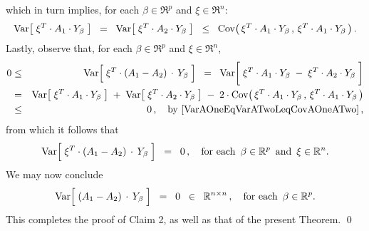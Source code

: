 which in turn implies, for each $\beta \in \Re^{p}$ and $\xi \in \Re^{n}$:
\begin{equation}\label{VarAOneEqVarATwoLeqCovAOneATwo}
\textnormal{Var}\!\left[\; \xi^{T} \cdot A_{1} \cdot Y_{\beta} \;\right]
\;\; = \;\;
\textnormal{Var}\!\left[\; \xi^{T} \cdot A_{2} \cdot Y_{\beta} \;\right]
\;\; \leq \;\;
\textnormal{Cov}\!\left(\,\xi^{T} \cdot A_{1} \cdot Y_{\beta}\,,\,\xi^{T} \cdot A_{1} \cdot Y_{\beta}\,\right).
\end{equation}
Lastly, observe that, for each $\beta \in \Re^{p}$ and $\xi \in \Re^{n}$,
\begin{eqnarray*}
0
&\leq&
	\Var\!\left[\;\xi^{T} \cdot (A_{1} - A_{2}) \overset{{\color{white}-}}{\cdot} Y_{\beta}\;\right]
\;\; = \;\;
	\Var\!\left[\;\xi^{T} \cdot A_{1} \cdot Y_{\beta} \;\overset{{\color{white}\vert}}{-}\; \xi^{T} \cdot A_{2} \cdot Y_{\beta}\;\right]
\\
& = &
	\Var\!\left[\;\xi^{T} \cdot A_{1} \cdot Y_{\beta}\;\right]
	\; + \;
	\Var\!\left[\;\xi^{T} \cdot A_{2} \cdot Y_{\beta}\;\right]
	\; - \;
	2\cdot\Cov\!\left(\,\xi^{T} \cdot A_{1} \cdot Y_{\beta}\,,\,\xi^{T} \cdot A_{1} \cdot Y_{\beta}\,\right)
\\
&\leq&
	0\,,
	\quad\textnormal{by \eqref{VarAOneEqVarATwoLeqCovAOneATwo}}\,,
\end{eqnarray*}
from which it follows that
\begin{equation*}
\Var\!\left[\;\xi^{T} \cdot (A_{1} - A_{2}) \overset{{\color{white}-}}{\cdot} Y_{\beta}\;\right]
\;\; =\;\; 0\,,
\quad
\textnormal{for each \,$\beta \in \Re^{p}$\, and \,$\xi \in \Re^{n}$}.
\end{equation*}
We may now conclude
\begin{equation*}
\Var\!\left[\;(A_{1} - A_{2}) \overset{{\color{white}-}}{\cdot} Y_{\beta}\;\right]
\;\;=\;\;
	0 \;\; \in \;\; \Re^{n \times n}\,,
\quad
\textnormal{for each \,$\beta \in \Re^{p}$}.
\end{equation*}
This completes the proof of Claim 2, as well as that of the present Theorem.
\qed


